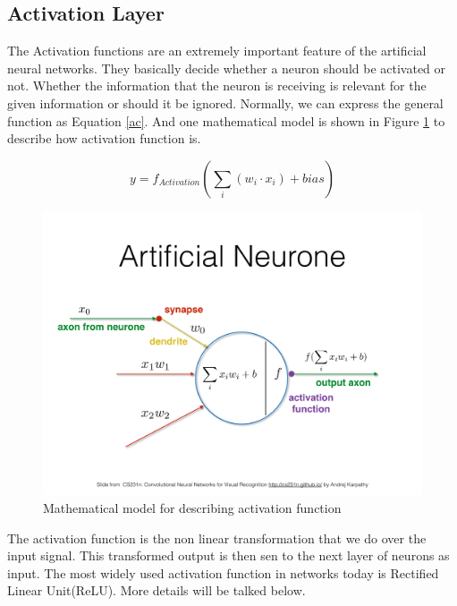     \subsection{Activation Layer}
    The Activation functions are an extremely important feature of the artificial neural networks. They basically decide whether a neuron should be activated or not. Whether the information that the neuron is receiving is relevant for the given information or should it be ignored. Normally, we can express the general function as Equation \ref{ac}. And one mathematical model is shown in Figure \ref{action} to describe how activation function is.

    \begin{equation}
        y = f_{Activation}(\sum_{i}(w_i \cdot x_i) + bias)
        \label{ac}
    \end{equation}

    \begin{figure}
        \centering
        \includegraphics[scale=0.3]{Figures/action.pdf}
        \caption{Mathematical model for describing activation function}
        \label{action}
    \end{figure}

    The activation function is the non linear transformation that we do over the input signal. This transformed output is then sen to the next layer of neurons as input. The most widely used activation function in networks today is Rectified Linear Unit(ReLU). More details will be talked below. 

